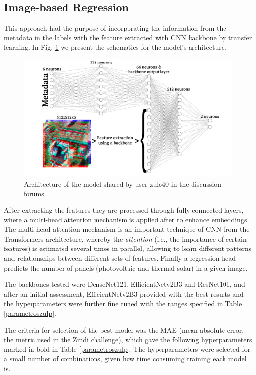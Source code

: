\documentclass[conference]{IEEEtran}
\begin{document}
\subsection{Image-based Regression}

This approach had the purpose of incorporating the information from the metadata in the labels with the feature extracted with CNN backbone by transfer learning. In Fig. \ref{fig:nn} we present the schematics for the model's architecture.

\begin{figure}[H]
    \centering
    \includegraphics[width=1\linewidth]{assets/nn.png}
    \caption{Architecture of the model shared by user zulo40 in the discussion forums. \cite{zulo4thewin}}
    \label{fig:nn}
\end{figure}

After extracting the features they are processed through fully connected layers, where a multi-head attention mechanism is applied after to enhance embeddings. The multi-head attention mechanism is an important technique of CNN from the Transformers architecture, whereby the \textit{attention} (i.e., the importance of certain features) is estimated several times in parallel, allowing to learn different patterns and relationships between different sets of features. Finally a regression head predicts the number of panels (photovoltaic and thermal solar) in a given image.

The backbones tested were DenseNet121, EfficientNetv2B3 and ResNet101, and after an initial assessment, EfficientNetv2B3 provided with the best results and the hyperparameters were further fine tuned with the ranges specified in Table \ref{parametroszulp}.

The criteria for selection of the best model was the MAE (mean absolute error, the metric used in the Zindi challenge), which gave the following hyperparameters marked in bold in Table \ref{parametroszulp}. The hyperparameters were selected for a small number of combinations, given how time consuming training each model is.
\end{document}
